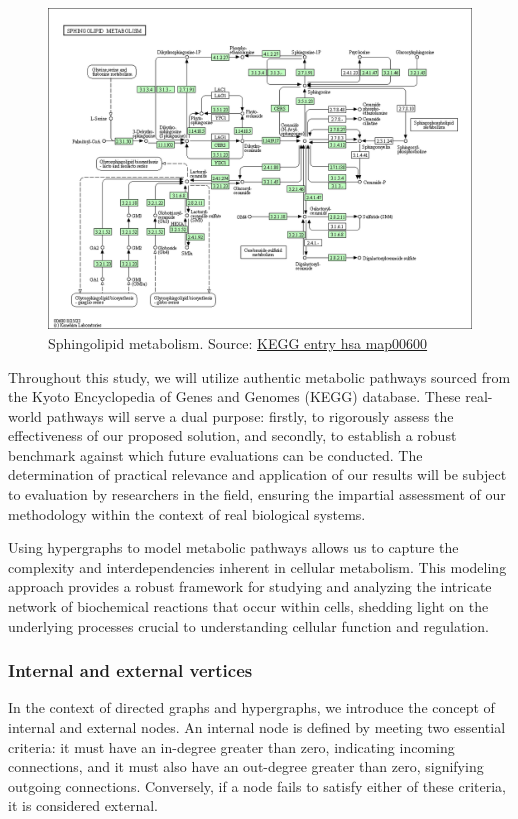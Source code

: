 \begin{figure}[H]
    \centering
    \includegraphics[width=\textwidth]{GEP1/hsa00600.png}
    \caption{Sphingolipid metabolism. Source: \href{https://www.kegg.jp/entry/map00600}{KEGG entry hsa map00600}}
    \label{fig:hsa00600}
\end{figure}

Throughout this study, we will utilize authentic metabolic pathways sourced from the Kyoto Encyclopedia of Genes and Genomes (KEGG) database. These real-world pathways will serve a dual purpose: firstly, to rigorously assess the effectiveness of our proposed solution, and secondly, to establish a robust benchmark against which future evaluations can be conducted. The determination of practical relevance and application of our results will be subject to evaluation by researchers in the field, ensuring the impartial assessment of our methodology within the context of real biological systems.

Using hypergraphs to model metabolic pathways allows us to capture the complexity and interdependencies inherent in cellular metabolism. This modeling approach provides a robust framework for studying and analyzing the intricate network of biochemical reactions that occur within cells, shedding light on the underlying processes crucial to understanding cellular function and regulation.

\subsubsection{Internal and external vertices} \label{sec:internal_external_definition}
In the context of directed graphs and hypergraphs, we introduce the concept of internal and external nodes. An internal node is defined by meeting two essential criteria: it must have an in-degree greater than zero, indicating incoming connections, and it must also have an out-degree greater than zero, signifying outgoing connections. Conversely, if a node fails to satisfy either of these criteria, it is considered external.

